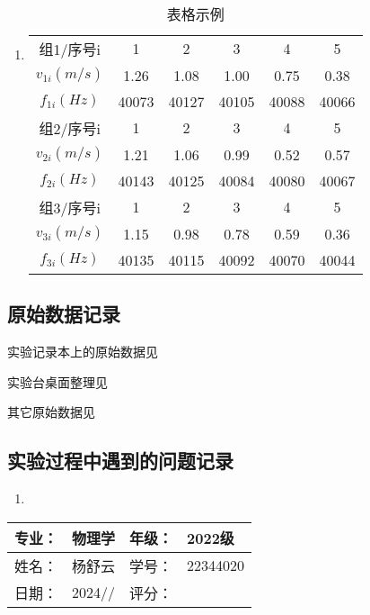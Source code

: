 \documentclass[dvipsnames, svgnames,a4paper,11pt]{article}
\begin{document}
	\subsubsection{}
	\begin{enumerate}
		\item \begin{table}[h]
			\centering
			\caption{表格示例}
			\label{tab:tab1}
			\begin{tabular}{|c|c|c|c|c|c|}
				\hline
				组1/序号i & 1 & 2 & 3 & 4 & 5 \\
				$v_{1i}(m/s)$ & 1.26 & 1.08 & 1.00 & 0.75 & 0.38 \\
				$f_{1i}(Hz)$ & 40073 & 40127 & 40105 & 40088 & 40066 \\
				\hline
				组2/序号i & 1 & 2 & 3 & 4 & 5 \\
				$v_{2i}(m/s)$ & 1.21 & 1.06 & 0.99 & 0.52 & 0.57 \\
				$f_{2i}(Hz)$ & 40143 & 40125 & 40084 & 40080 & 40067 \\
				\hline
				组3/序号i & 1 & 2 & 3 & 4 & 5 \\
				$v_{3i}(m/s)$ & 1.15 & 0.98 & 0.78 & 0.59 & 0.36 \\
				$f_{3i}(Hz)$ & 40135 & 40115 & 40092 & 40070 & 40044 \\
				\hline
			\end{tabular}
		\end{table}		
	\end{enumerate}
	
	
	\clearpage
	\subsection{原始数据记录}
	实验记录本上的原始数据见%
	
	实验台桌面整理见%
	
	其它原始数据见%
	
	\subsection{实验过程中遇到的问题记录}
	\begin{enumerate}
		\item 
	\end{enumerate}
	
	
	
	\clearpage
	
	\begin{table}
		\renewcommand\arraystretch{1.7}
		\begin{tabularx}{\textwidth}{|X|X|X|X|}
			\hline
			专业：& 物理学 &年级：& 2022级\\
			\hline
			姓名： & 杨舒云 & 学号：& 22344020\\
			\hline
			日期：& 2024// & 评分： &\\
			\hline
		\end{tabularx}
	\end{table}
	
\end{document}
